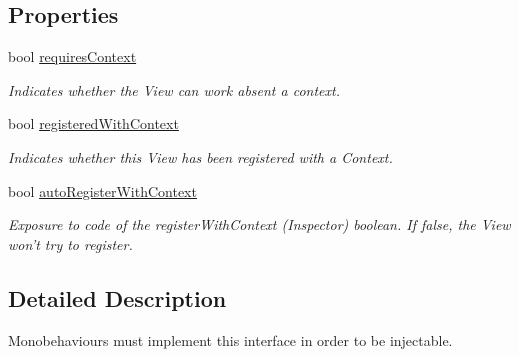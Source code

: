 \subsection*{Properties}
\begin{DoxyCompactItemize}
\item 
bool \hyperlink{interfacestrange_1_1extensions_1_1mediation_1_1api_1_1_i_view_a0d9c314f274cd64133a8c97116ba9332}{requires\-Context}
\begin{DoxyCompactList}\small\item\em Indicates whether the View can work absent a context. \end{DoxyCompactList}\item 
\hypertarget{interfacestrange_1_1extensions_1_1mediation_1_1api_1_1_i_view_ac6eca04af420be4cb7ad637df4c8ff9c}{bool \hyperlink{interfacestrange_1_1extensions_1_1mediation_1_1api_1_1_i_view_ac6eca04af420be4cb7ad637df4c8ff9c}{registered\-With\-Context}}\label{interfacestrange_1_1extensions_1_1mediation_1_1api_1_1_i_view_ac6eca04af420be4cb7ad637df4c8ff9c}

\begin{DoxyCompactList}\small\item\em Indicates whether this View has been registered with a Context. \end{DoxyCompactList}\item 
\hypertarget{interfacestrange_1_1extensions_1_1mediation_1_1api_1_1_i_view_a245fba8e916c754e8cee754ce683b846}{bool \hyperlink{interfacestrange_1_1extensions_1_1mediation_1_1api_1_1_i_view_a245fba8e916c754e8cee754ce683b846}{auto\-Register\-With\-Context}}\label{interfacestrange_1_1extensions_1_1mediation_1_1api_1_1_i_view_a245fba8e916c754e8cee754ce683b846}

\begin{DoxyCompactList}\small\item\em Exposure to code of the register\-With\-Context (Inspector) boolean. If false, the View won't try to register. \end{DoxyCompactList}\end{DoxyCompactItemize}


\subsection{Detailed Description}
Monobehaviours must implement this interface in order to be injectable. 

